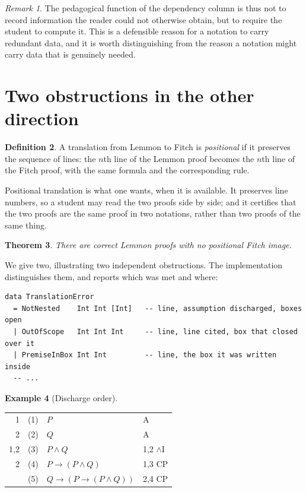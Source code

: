\documentclass[11pt]{article}
\makeatletter
\theoremstyle{plain}
\newtheorem{theorem}{Theorem}
\theoremstyle{definition}
\newtheorem{definition}[theorem]{Definition}
\newtheorem{example}[theorem]{Example}
\theoremstyle{remark}
\newtheorem{remark}[theorem]{Remark}
\newcommand{\dep}[1]{\textup{#1}}
\newenvironment{lemmonproof}
  {\begin{center}\begin{tabular}{@{}r@{\hspace{1.5em}}r@{\hspace{0.6em}}l@{\hspace{2.5em}}l@{}}}
  {\end{tabular}\end{center}}
\makeatother
\begin{document}
\begin{remark}
The pedagogical function of the dependency column is thus not to record
information the reader could not otherwise obtain, but to require the student
to compute it. This is a defensible reason for a notation to carry redundant
data, and it is worth distinguishing from the reason a notation might carry
data that is genuinely needed.
\end{remark}

\section{Two obstructions in the other direction}\label{sec:obstructions}

\begin{definition}
A translation from Lemmon to Fitch is \emph{positional} if it preserves the
sequence of lines: the $n$th line of the Lemmon proof becomes the $n$th line
of the Fitch proof, with the same formula and the corresponding rule.
\end{definition}

Positional translation is what one wants, when it is available. It preserves
line numbers, so a student may read the two proofs side by side; and it
certifies that the two proofs are the same proof in two notations, rather than
two proofs of the same thing.

\begin{theorem}\label{thm:notpositional}
There are correct Lemmon proofs with no positional Fitch image.
\end{theorem}

We give two, illustrating two independent obstructions. The implementation
distinguishes them, and reports which was met and where:

\begin{lstlisting}
data TranslationError
  = NotNested    Int Int [Int]   -- line, assumption discharged, boxes open
  | OutOfScope   Int Int Int     -- line, line cited, box that closed over it
  | PremiseInBox Int Int         -- line, the box it was written inside
  -- ...
\end{lstlisting}

\begin{example}[Discharge order]\label{ex:order}
\begin{lemmonproof}
\dep{1}   & (1) & $P$                        & A \\
\dep{2}   & (2) & $Q$                        & A \\
\dep{1,2} & (3) & $P \wedge Q$               & 1,2 $\wedge$I \\
\dep{2}   & (4) & $P \to (P \wedge Q)$       & 1,3 CP \\
          & (5) & $Q \to (P \to (P \wedge Q))$ & 2,4 CP \\
\end{lemmonproof}
\end{example}
\end{document}
